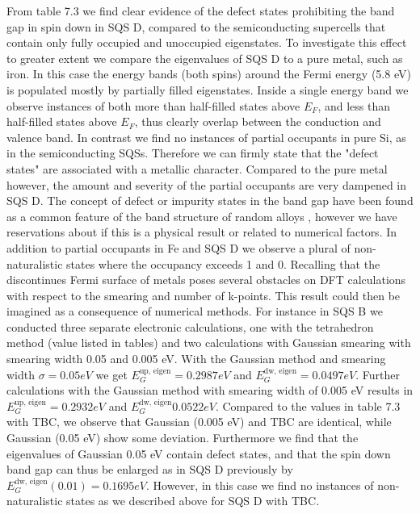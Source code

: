 From table 7.3 we find clear evidence of the defect states prohibiting the band gap in spin down in SQS D, compared to the semiconducting supercells that contain only fully occupied and unoccupied eigenstates. To investigate this effect to greater extent we compare the eigenvalues of SQS D to a pure metal, such as iron. In this case the energy bands (both spins) around the Fermi energy (5.8 eV) is populated mostly by partially filled eigenstates. Inside a single energy band we observe instances of both more than half-filled states above $E_F$, and less than half-filled states above $E_F$, thus clearly overlap between the conduction and valence band. In contrast we find no instances of partial occupants in pure Si, as in the semiconducting SQSs. Therefore we can firmly state that the "defect states" are associated with a metallic character. Compared to the pure metal however, the amount and severity of the partial occupants are very dampened in SQS D. The concept of defect or impurity states in the band gap have been found as a common feature of the band structure of random alloys \cite{PhysRevLett.104.236403}, however we have reservations about if this is a physical result or related to numerical factors. In addition to partial occupants in Fe and SQS D we observe a plural of non-naturalistic states where the occupancy exceeds 1 and 0. Recalling that the discontinues Fermi surface of metals poses several obstacles on DFT calculations with respect to the smearing and number of k-points. This result could then be imagined as a consequence of numerical methods. For instance in SQS B we conducted three separate electronic calculations, one with the tetrahedron method (value listed in tables) and two calculations with Gaussian smearing with smearing width 0.05 and 0.005 eV. With the Gaussian method and smearing width $\sigma = 0.05 eV$ we get $E_G ^\text{up, eigen} = 0.2987 eV$ and $E_G ^\text{dw, eigen} = 0.0497 eV$. Further calculations with the Gaussian method with smearing width of 0.005 eV results in $E_G ^\text{up, eigen} = 0.2932 eV$ and $E_G ^\text{dw, eigen} 0.0522 eV$. Compared to the values in table 7.3 with TBC, we observe that Gaussian (0.005 eV) and TBC are identical, while Gaussian (0.05 eV) show some deviation. Furthermore we find that the eigenvalues of Gaussian 0.05 eV contain defect states, and that the spin down band gap can thus be enlarged as in SQS D previously by $E_G ^\text{dw, eigen}(0.01) = 0.1695 eV$. However, in this case we find no instances of non-naturalistic states as we described above for SQS D with TBC.
  
